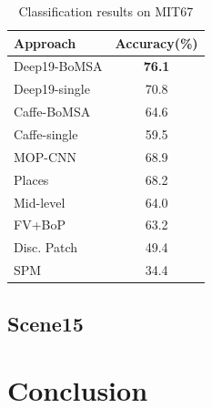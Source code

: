 \documentclass[10pt,twocolumn,letterpaper]{article}
\begin{document}
\begin{table}
\begin{center}
\begin{tabular}{|l|c|}
\hline
Approach & Accuracy(\%) \\
\hline
Deep19-BoMSA & \textbf{76.1} \\
Deep19-single & 70.8 \\
Caffe-BoMSA & 64.6	\\
Caffe-single & 59.5 \\ \hline
MOP-CNN~\cite{Gong14} & 68.9 \\
Places~\cite{Places}	& 68.2	\\
Mid-level~\cite{mid_level} & 64.0	\\
FV+BoP~\cite{FV_BoP} & 63.2 \\
Disc. Patch~\cite{disc_patch} & 49.4 \\
SPM~\cite{spatial_pyramid} & 34.4	\\
\hline
\end{tabular}
\end{center}
\caption{Classification results on MIT67}
\label{table:MIT67}
\end{table}


\subsection{Scene15}



\section{Conclusion}




{\small


}
\end{document}
